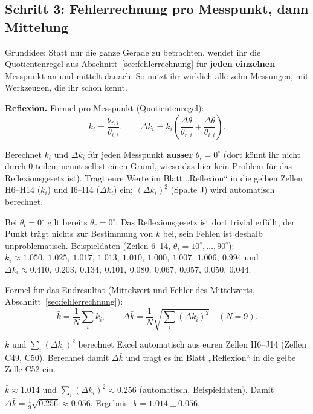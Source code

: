 \documentclass[11pt,a4paper]{article}
\newcommand{\zeichenraum}[1][4.5cm]{%
  \par\vspace{4pt}\noindent
  \fbox{\begin{minipage}[t][#1][t]{\dimexpr\linewidth-2\fboxsep-2\fboxrule}\ \end{minipage}}
  \vspace{4pt}
}
\begin{document}
\subsection{Schritt 3: Fehlerrechnung pro Messpunkt, dann Mittelung}

Grundidee: Statt nur die ganze Gerade zu betrachten, wendet ihr die Quotientenregel aus Abschnitt~\ref{sec:fehlerrechnung} für \textbf{jeden einzelnen} Messpunkt an und mittelt danach. So nutzt ihr wirklich alle zehn Messungen, mit Werkzeugen, die ihr schon kennt.

\textbf{Reflexion.} Formel pro Messpunkt (Quotientenregel):
\[
  k_i = \frac{\theta_{r,i}}{\theta_{i,i}}, \qquad \Delta k_i = k_i\left(\frac{\Delta\theta}{\theta_{r,i}}+\frac{\Delta\theta}{\theta_{i,i}}\right).
\]

\begin{aufgabebox}
Berechnet $k_i$ und $\Delta k_i$ für jeden Messpunkt \textbf{ausser} $\theta_i=0^\circ$ (dort könnt ihr nicht durch $0$ teilen; nennt selbst einen Grund, wieso das hier kein Problem für das Reflexionsgesetz ist). Tragt eure Werte im Blatt „Reflexion“ in die gelben Zellen H6--H14 ($k_i$) und I6--I14 ($\Delta k_i$) ein; $(\Delta k_i)^2$ (Spalte J) wird automatisch berechnet.
\end{aufgabebox}
\zeichenraum[2.5cm]
\begin{solution}
\begin{loesungbox}
Bei $\theta_i=0^\circ$ gilt bereits $\theta_r=0^\circ$: Das Reflexionsgesetz ist dort trivial erfüllt, der Punkt trägt nichts zur Bestimmung von $k$ bei, sein Fehlen ist deshalb unproblematisch. Beispieldaten (Zeilen 6--14, $\theta_i=10^\circ,\dots,90^\circ$): $k_i \approx 1.050,\ 1.025,\ 1.017,\ 1.013,\ 1.010,\ 1.000,\ 1.007,\ 1.006,\ 0.994$ und $\Delta k_i \approx 0.410,\ 0.203,\ 0.134,\ 0.101,\ 0.080,\ 0.067,\ 0.057,\ 0.050,\ 0.044$.
\end{loesungbox}
\end{solution}

Formel für das Endresultat (Mittelwert und Fehler des Mittelwerts, Abschnitt~\ref{sec:fehlerrechnung}):
\[
  \bar k = \frac{1}{N}\sum_i k_i, \qquad \Delta \bar k = \frac{1}{N}\sqrt{\sum_i (\Delta k_i)^2} \quad (N=9).
\]
\begin{aufgabebox}
$\bar k$ und $\sum_i(\Delta k_i)^2$ berechnet Excel automatisch aus euren Zellen H6--J14 (Zellen C49, C50). Berechnet damit $\Delta\bar k$ und tragt es im Blatt „Reflexion“ in die gelbe Zelle C52 ein.
\end{aufgabebox}
\zeichenraum[3cm]
\begin{solution}
\begin{loesungbox}
$\bar k \approx 1.014$ und $\sum_i(\Delta k_i)^2\approx0.256$ (automatisch, Beispieldaten). Damit $\Delta\bar k = \frac{1}{9}\sqrt{0.256}\approx0.056$. Ergebnis: $k=1.014\pm0.056$.
\end{loesungbox}
\end{solution}
\end{document}
